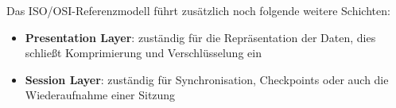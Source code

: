 Das ISO/OSI-Referenzmodell führt zusätzlich noch folgende weitere Schichten:

\begin{itemize}
    \item \textbf{Presentation Layer}: zuständig für die Repräsentation der Daten, dies schließt Komprimierung und Verschlüsselung ein
    \item \textbf{Session Layer}: zuständig für Synchronisation, Checkpoints oder auch die Wiederaufnahme einer Sitzung
\end{itemize}

